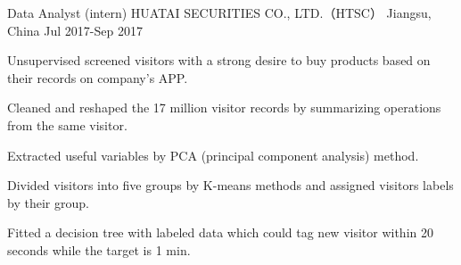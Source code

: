 \begin{cventries}
  \cventry
    {Data Analyst (intern)} %
    {HUATAI SECURITIES CO., LTD.（HTSC）} %
    {Jiangsu, China} %
    {Jul 2017-Sep 2017} %
    {
      \begin{cvitems} %
        \item {Unsupervised screened visitors with a strong desire to buy products based on their records on company’s APP.}
        \item {Cleaned and reshaped the 17 million visitor records by summarizing operations from the same visitor.}
        \item {Extracted useful variables by PCA (principal component analysis) method.}
        \item {Divided visitors into five groups by K-means methods and assigned visitors labels by their group.}
        \item {Fitted a decision tree with labeled data which could tag new visitor within 20 seconds while the target is 1 min.}
      \end{cvitems}
    }

\end{cventries}
